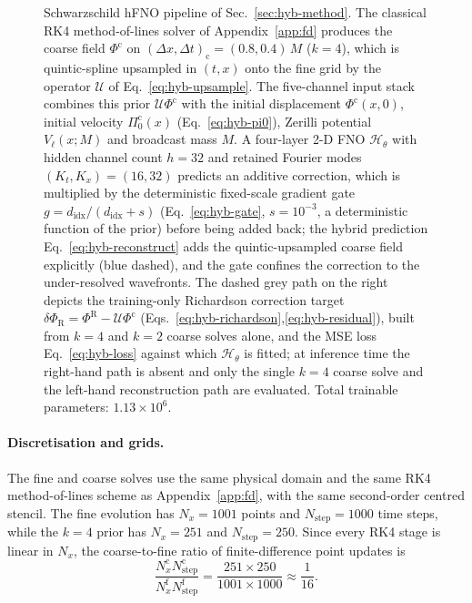 \begin{figure}[!htbp]
{
}
\caption{Schwarzschild hFNO pipeline of Sec.~\ref{sec:hyb-method}.
The classical RK4
method-of-lines solver of Appendix~\ref{app:fd} produces the
coarse field $\Phi^{\mathrm{c}}$ on
$(\Delta x,\Delta t)_{\mathrm{c}} = (0.8,0.4)\,M$ ($k=4$), which
is quintic-spline upsampled in $(t,x)$ onto the fine grid by the
operator $\mathcal{U}$ of Eq.~\eqref{eq:hyb-upsample}. The
five-channel input stack combines this prior
$\mathcal{U}\Phi^{\mathrm{c}}$ with the initial displacement
$\Phi^{\mathrm{c}}(x,0)$, initial velocity
$\Pi^{\mathrm{c}}_{0}(x)$ (Eq.~\eqref{eq:hyb-pi0}), Zerilli
potential $V_{\ell}(x;M)$ and broadcast mass $M$. A four-layer
2-D FNO $\mathcal{H}_{\theta}$ with hidden channel count
$h = 32$ and retained Fourier modes $(K_{t},K_{x}) = (16,32)$
predicts an additive correction, which is multiplied by the
deterministic fixed-scale gradient gate
$g=d_{\mathrm{idx}}/(d_{\mathrm{idx}}+s)$
(Eq.~\eqref{eq:hyb-gate}, $s = 10^{-3}$, a deterministic
function of the prior) before being added back; the hybrid
prediction Eq.~\eqref{eq:hyb-reconstruct} adds the
quintic-upsampled coarse field explicitly (blue dashed),
and the gate confines the correction to the under-resolved
wavefronts. The dashed grey path on the right depicts the
training-only Richardson correction target
$\delta\Phi_{\mathrm{R}} = \Phi^{\mathrm{R}} -
\mathcal{U}\Phi^{\mathrm{c}}$
(Eqs.~\eqref{eq:hyb-richardson},\eqref{eq:hyb-residual}), built
from $k = 4$ and $k = 2$ coarse solves alone, and the MSE loss
Eq.~\eqref{eq:hyb-loss} against which $\mathcal{H}_{\theta}$ is
fitted; at inference time the right-hand path is absent and
only the single $k = 4$ coarse solve and the left-hand
reconstruction path are evaluated. Total trainable parameters:
$1.13\times 10^{6}$.}
\label{fig:hyb-arch}
\end{figure}

\paragraph{Discretisation and grids.} The fine and coarse solves use
the same physical domain and the same RK4 method-of-lines scheme as
Appendix~\ref{app:fd}, with the same second-order centred stencil.
The fine evolution has $N_x=1001$ points and $N_{\mathrm{step}}=1000$
time steps, while the $k=4$ prior has $N_x=251$ and
$N_{\mathrm{step}}=250$. Since every RK4 stage is linear in $N_x$,
the coarse-to-fine ratio of finite-difference point updates is
\begin{equation}
  \frac{N_x^{\mathrm c}N_{\mathrm{step}}^{\mathrm c}}
       {N_x^{\mathrm f}N_{\mathrm{step}}^{\mathrm f}}
  = \frac{251\times250}{1001\times1000}
  \approx \frac{1}{16}.
  \label{eq:hyb-work-ratio}
\end{equation}

